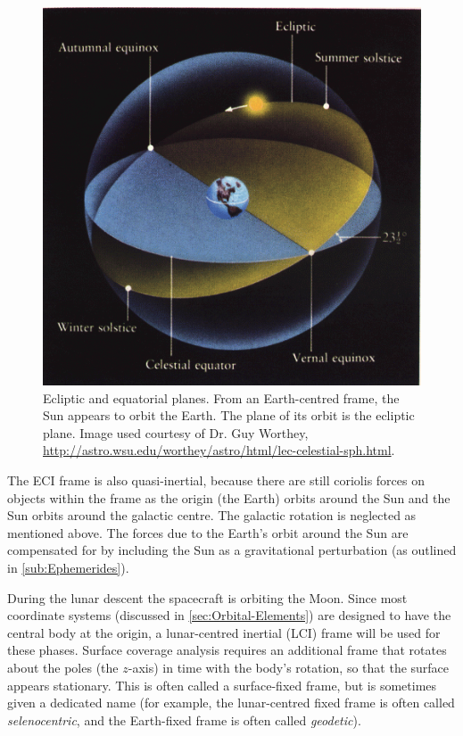 \begin{figure} [htp]
\caption{Ecliptic and equatorial planes. From an Earth-centred frame, the Sun appears to orbit the Earth. The plane of its orbit is the ecliptic plane. Image used courtesy of Dr. Guy Worthey, \url{http://astro.wsu.edu/worthey/astro/html/lec-celestial-sph.html}.}
\label{fig:Ecliptic-plane}
\centering
\includegraphics [scale=0.75]{Images/cel-sphere-2.png}
\end{figure}

The ECI frame is also quasi-inertial, because there are still coriolis forces on objects within the frame as the origin (the Earth) orbits around the Sun and the Sun orbits around the galactic centre. The galactic rotation is neglected as mentioned above. The forces due to the Earth's orbit around the Sun are compensated for by including the Sun as a gravitational perturbation (as outlined in \autoref{sub:Ephemerides}).

During the lunar descent the spacecraft is orbiting the Moon. Since most coordinate systems (discussed in \autoref{sec:Orbital-Elements}) are designed to have the central body at the origin, a lunar-centred inertial (LCI) frame will be used for these phases. Surface coverage analysis requires an additional frame that rotates about the poles (the $z$-axis) in time with the body's rotation, so that the surface appears stationary. This is often called a surface-fixed frame, but is sometimes given a dedicated name (for example, the lunar-centred fixed frame is often called \emph{selenocentric}, and the Earth-fixed frame is often called \emph{geodetic}).

